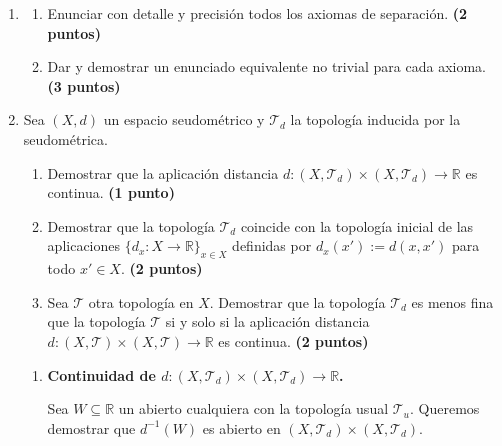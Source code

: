 \begin{enumerate}
    \item 
    \begin{enumerate}
        \item Enunciar con detalle y precisión todos los axiomas de separación.
        \hfill \textbf{(2 puntos)}
        \item Dar y demostrar un enunciado equivalente no trivial para cada axioma.
        \hfill \textbf{(3 puntos)}
    \end{enumerate}

    \item Sea $(X, d)$ un espacio seudométrico y $\mathcal{T}_d$ la topología inducida por la seudométrica.
    \begin{enumerate}
        \item Demostrar que la aplicación distancia $d : (X, \mathcal{T}_d) \times (X, \mathcal{T}_d) \to \mathbb{R}$ es continua.
        \hfill \textbf{(1 punto)}
        \item Demostrar que la topología $\mathcal{T}_d$ coincide con la topología inicial de las aplicaciones $\{d_x : X \to \mathbb{R}\}_{x \in X}$ definidas por $d_x(x') := d(x, x')$ para todo $x' \in X$.
        \hfill \textbf{(2 puntos)}
        \item Sea $\mathcal{T}$ otra topología en $X$. Demostrar que la topología $\mathcal{T}_d$ es menos fina que la topología $\mathcal{T}$ si y solo si la aplicación distancia $d : (X, \mathcal{T}) \times (X, \mathcal{T}) \to \mathbb{R}$ es continua.
        \hfill \textbf{(2 puntos)}
    \end{enumerate}
    \begin{sol}
        \begin{enumerate}
    \item[\textbf{a)}] \textbf{Continuidad de $d : (X, \mathcal{T}_d) \times (X, \mathcal{T}_d) \to \mathbb{R}$.}
    
    \begin{dem}Sea $W \subseteq \mathbb{R}$ un abierto cualquiera con la topología usual $\mathcal{T}_u$. Queremos demostrar que $d^{-1}(W)$ es abierto en $(X, \mathcal{T}_d) \times (X, \mathcal{T}_d)$.
    

\end{dem}
\end{enumerate}
\end{sol}
\end{enumerate}
